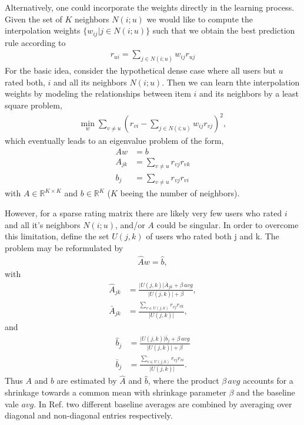 \documentclass[10pt,a4paper]{article}
\begin{document}
Alternatively, one could incorporate the weights directly in the learning process. Given the set of $K$ neighbors $N(i;u)$ we would like to compute
the interpolation weights $\{w_{ij} | j \in N(i;u) \}$ such that we obtain the best prediction rule according to
\begin{align} \label{eq:cf_basic}
r_{ui} =  \sum_{j \in N(i;u)}  w_{ij}r_{uj}
\end{align}
For the basic idea, consider the hypothetical dense case where all users but $u$ rated both, $i$ and all its neighbors $N(i;u)$. Then we can learn thte interpolation weights by modeling the relationships between item $i$ and its neighbors by a least square problem,
\begin{align}
\min_{w} \sum_{v \neq u} \left( r_{vi} - \sum_{j \in N(i;u)} w_{ij}r_{vj}   \right)^2,
\end{align}
which eventually leads to an eigenvalue problem of the form,
\begin{align}
A w &= b \\
A_{jk} &=\sum_{v \neq u } r_{vj}r_{vk} \\
b_j &= \sum_{v \neq  u} r_{vj} r_{vi}
\end{align}
with $A \in \mathbb{R}^{K\times K}$ and $b \in \mathbb R ^K $ ($K$ beeing the number of neighbors).

However, for a sparse  rating matrix there are likely very few users who rated $i$ and all it's neighbors $N(i;u)$, and/or $A$ could be singular. In order to overcome this limitation, define the set $U(j,k)$ of users who rated both j and k. The problem may be reformulated by \cite{bell_yehuda_netflix_2007}
\begin{align} \label{CF_hat_equation}
\hat A w = \hat b, 
\end{align}  
with
\begin{align}
\hat A_{jk} &= \frac{\lvert U(j,k)\rvert \bar A_{jk} + \beta\,  avg}{\lvert U(j,k)\rvert + \beta}, \\
\bar A_{jk} &= \frac{\sum_{v \in U(j,k)} r_{vj} r_{vk} }{\lvert U(j,k)\rvert }, \end{align}
and 
\begin{align}
\hat b_{j} &= \frac{\lvert U(j,k)\rvert \bar b_{j} + \beta\,  avg}{\lvert U(j,k)\rvert + \beta} \\
\bar b_{j} &= \frac{\sum_{v \in U(j,k)} r_{vj} r_{vi} }{\lvert U(j,k)\rvert }.
\end{align}
Thus $A$ and $b$ are estimated by $\hat A$ and $\hat b$, where the product $\beta\, avg$ accounts for a shrinkage towards a common mean with shrinkage parameter $\beta$ and the baseline vale $avg$. In Ref. \cite{bell_yehuda_netflix_2007} two different baseline averages are combined by averaging over diagonal and non-diagonal entries respectively.
\end{document}
